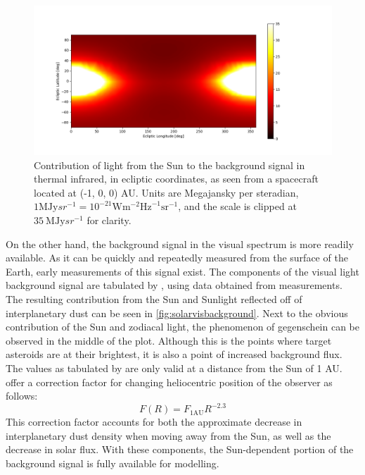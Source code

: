 \begin{figure}[htbp]
 \centering
 \includegraphics[width=1.0\textwidth]{img/background_tir_zodiac.png}
 \caption{Contribution of light from the Sun to the background signal in thermal infrared, in ecliptic coordinates, as seen from a spacecraft located at (-1, 0, 0) AU. Units are Megajansky per steradian, $1 \mathrm{MJy}{sr}^{-1} = 10^{-21} \mathrm{W}\mathrm{m}^{-2}\mathrm{Hz}^{-1}\mathrm{sr}^{-1}$, and the scale is clipped at $35 ~\mathrm{MJy}{sr}^{-1}$ for clarity.}
 \label{fig:solartirbackground}
\end{figure}

On the other hand, the background signal in the visual spectrum is more readily available. As it can be quickly and repeatedly measured from the surface of the Earth, early measurements of this signal exist. The components of the visual light background signal are tabulated by \cite{LightOfTheNightSky}, using data obtained from measurements. The resulting contribution from the Sun and Sunlight reflected off of interplanetary dust can be seen in \autoref{fig:solarvisbackground}. Next to the obvious contribution of the Sun and zodiacal light, the phenomenon of gegenschein can be observed in the middle of the plot. Although this is the points where target asteroids are at their brightest, it is also a point of increased background flux. The values as tabulated by \cite{LightOfTheNightSky} are only valid at a distance from the Sun of 1 AU. \cite{SkyBrightness} offer a correction factor for changing heliocentric position of the observer as follows:
\begin{equation}
 F(R) = F_{1\mathrm{AU}}R^{-2.3}
 \label{eq:sunscale}
\end{equation}
This correction factor accounts for both the approximate decrease in interplanetary dust density when moving away from the Sun, as well as the decrease in solar flux. With these components, the Sun-dependent portion of the background signal is fully available for modelling. \\

